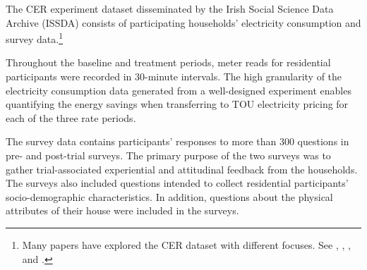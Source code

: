 The CER experiment dataset disseminated by the Irish Social Science Data Archive (ISSDA) consists of participating households' electricity consumption and survey data.\footnote{Many papers have explored the CER dataset with different focuses. See \cite{Reducing-Household-Electricity-Demand-through-Smart-Metering_Carroll-et-al_2014}, \cite{Unintended-Outcomes-of-Electricity-Smart-Metering_McCoy-and-Lyons_2016}, \cite{Nudging-Electricity-Consumption-using-TOU-Pricing-and-Feedback_Cosmo-and-OHora_2017}, and \cite{Estimating-the-Impact-of-Time-Of-Use-Pricing-on-Irish-Electricity-Demand_Di-Cosmo-et-al_2014}.}  

Throughout the baseline and treatment periods, meter reads for residential participants were recorded in 30-minute intervals. The high granularity of the electricity consumption data generated from a well-designed experiment enables quantifying the energy savings when transferring to TOU electricity pricing for each of the three rate periods. 

The survey data contains participants' responses to more than 300 questions in pre- and post-trial surveys. The primary purpose of the two surveys was to gather trial-associated experiential and attitudinal feedback from the households. The surveys also included questions intended to collect residential participants' socio-demographic characteristics. In addition, questions about the physical attributes of their house were included in the surveys. 

